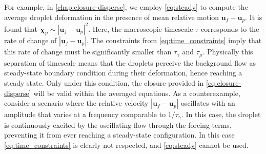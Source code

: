 For example, in \ref{chap:closure-disperse}, we employ \ref{eq:steady} to compute the average droplet deformation in the presence of mean relative motion $\textbf{u}_f-\textbf{u}_p$. 
It is found that $\bm\chi_p \sim |\textbf{u}_f-\textbf{u}_p|^2$. 
Here, the macroscopic timescale $\tau$ corresponds to the rate of change of $|\textbf{u}_f-\textbf{u}_p|$.  
The constraints from \ref{eq:time_constraints} imply that this rate of change must be significantly smaller than $\tau_\gamma$ and $\tau_\mu$. 
Physically this separation of timescale means that the droplets perceive the background flow as steady-state boundary condition during their deformation, hence reaching a steady state.
Only under this condition, the closure provided in  \ref{eq:closure-disperse} will be valid within the averaged equations.  
As a counterexample, consider a scenario where the relative velocity $|\textbf{u}_f-\textbf{u}_p|$ oscillates with an amplitude that varies at a frequency comparable to $1/\tau_\gamma$. 
In this case, the droplet is continuously excited by the oscillating flow through the forcing terms, preventing it from ever reaching a steady-state configuration. 
In this case \ref{eq:time_constraints} is clearly not respected, and \ref{eq:steady} cannot be used. 


